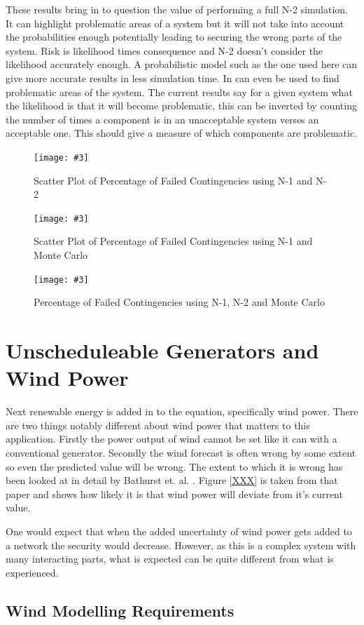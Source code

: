 \documentclass[a4paper,oneside,12pt]{report}
\newcommand{\mynotebox}[2] {\noindent\vspace{5pt}
\fbox{
  \begin{minipage}[t]{\textwidth}
    \textbf{#1} {\ttfamily #2}
  \end{minipage}
}\vspace{5pt}}
\renewcommand{\todo}[1] {\mynotebox{Todo:}{#1}}
\newcommand{\image}[3] {
  \begin{figure}
    \begin{center}
      \texttt{[image: \#3]}
      \caption{#2}
      \label{#1}
    \end{center}
  \end{figure}
}
\begin{document}
These results bring in to question the value of performing a full N-2 simulation. It can highlight problematic areas of a system but it will not take into account the probabilities enough potentially leading to securing the wrong parts of the system. Risk is likelihood times consequence and N-2 doesn't consider the likelihood accurately enough. A probabilistic model such as the one used here can give more accurate results in less simulation time. In can even be used to find problematic areas of the system. The current results say for a given system what the likelihood is that it will become problematic, this can be inverted by counting the number of times a component is in an unacceptable system verses an acceptable one. This should give a measure of which components are problematic.



\image{scatter-n1-n2}{Scatter Plot of Percentage of Failed Contingencies using N-1 and N-2}{scatter-n1-n2.png}
\image{scatter-mc-n2}{Scatter Plot of Percentage of Failed Contingencies using N-1 and Monte Carlo}{scatter-mc-n2.png}
\image{mc-n1-n2}{Percentage of Failed Contingencies using N-1, N-2 and Monte Carlo}{mc-n1-n2.png}


\section{Unscheduleable Generators and Wind Power}

Next renewable energy is added in to the equation, specifically wind power. There are two things notably different about wind power that matters to this application. Firstly the power output of wind cannot be set like it can with a conventional generator. Secondly the wind forecast is often wrong by some extent so even the predicted value will be wrong. The extent to which it is wrong has been looked at in detail by Bathurst et. al. \cite{Bathurst2002}. Figure \ref{XXX} is taken from that paper and shows how likely it is that wind power will deviate from it's current value. 

\todo{image XXX}

One would expect that when the added uncertainty of wind power gets added to a network the security would decrease. However, as this is a complex system with many interacting parts, what is expected can be quite different from what is experienced. 

\subsection{Wind Modelling Requirements}
\end{document}

